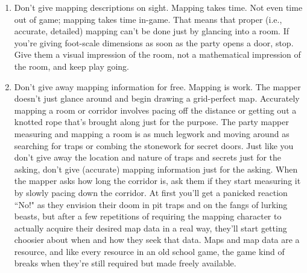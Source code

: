 \documentclass[twoside]{article}
\begin{document}
\begin{enumerate}[nosep]
\item Don't give mapping descriptions on sight. Mapping takes time. Not even time out of game; mapping takes time in-game. That means that proper (i.e., accurate, detailed) mapping can't be done just by glancing into a room. If you're giving foot-scale dimensions as soon as the party opens a door, stop. Give them a visual impression of the room, not a mathematical impression of the room, and keep play going.
\item Don't give away mapping information for free. Mapping is work. The mapper doesn't just glance around and begin drawing a grid-perfect map. Accurately mapping a room or corridor involves pacing off the distance or getting out a knotted rope that's brought along just for the purpose. The party mapper measuring and mapping a room is as much legwork and moving around as searching for traps or combing the stonework for secret doors. Just like you don't give away the location and nature of traps and secrets just for the asking, don't give (accurate) mapping information just for the asking. When the mapper asks how long the corridor is, ask them if they start measuring it by slowly pacing down the corridor. At first you'll get a panicked reaction ``No!" as they envision their doom in pit traps and on the fangs of lurking beasts, but after a few repetitions of requiring the mapping character to actually acquire their desired map data in a real way, they'll start getting choosier about when and how they seek that data. Maps and map data are a resource, and like every resource in an old school game, the game kind of breaks when they're still required but made freely available.


\end{enumerate}
\end{document}
